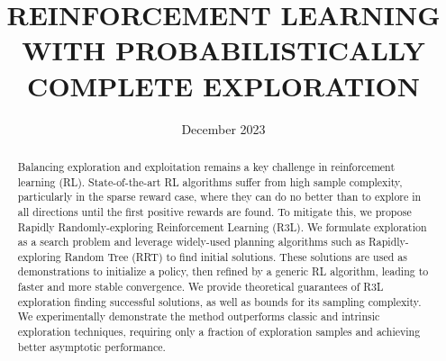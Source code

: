 \documentclass{article}
\title{REINFORCEMENT LEARNING WITH
PROBABILISTICALLY COMPLETE EXPLORATION}
\author{ }
\date{December 2023}
\begin{document}
\maketitle
\begin{abstract}
    Balancing exploration and exploitation remains a key challenge in reinforcement
learning (RL). State-of-the-art RL algorithms suffer from high sample complexity,
particularly in the sparse reward case, where they can do no better than to explore in
all directions until the first positive rewards are found. To mitigate this, we propose
Rapidly Randomly-exploring Reinforcement Learning (R3L). We formulate exploration as a search problem and leverage widely-used planning algorithms such as
Rapidly-exploring Random Tree (RRT) to find initial solutions. These solutions are
used as demonstrations to initialize a policy, then refined by a generic RL algorithm,
leading to faster and more stable convergence. We provide theoretical guarantees
of R3L exploration finding successful solutions, as well as bounds for its sampling
complexity. We experimentally demonstrate the method outperforms classic and
intrinsic exploration techniques, requiring only a fraction of exploration samples
and achieving better asymptotic performance.

\end{abstract}
\end{document}
